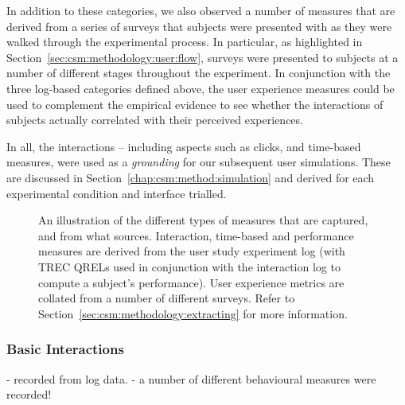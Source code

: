 In addition to these categories, we also observed a number of  measures that are derived from a series of surveys that subjects were presented with as they were walked through the experimental process. In particular, as highlighted in Section~\ref{sec:csm:methodology:user:flow}, surveys were presented to subjects at a number of different stages throughout the experiment. In conjunction with the three log-based categories defined above, the user experience measures could be used to complement the empirical evidence to see whether the interactions of subjects actually correlated with their perceived experiences.

In all, the interactions -- including aspects such as clicks, and time-based measures, were used as a \emph{grounding} for our subsequent user simulations. These are discussed in Section~\ref{chap:csm:method:simulation} and derived for each experimental condition and interface trialled.

\begin{figure}[t!]
    \centering
    \caption[Examples of Evaluation Measures]{An illustration of the different types of measures that are captured, and from what sources. Interaction, time-based and performance measures are derived from the user study experiment log (with TREC QRELs used in conjunction with the interaction log to compute a subject's performance). User experience metrics are collated from a number of different surveys. Refer to Section~\ref{sec:csm:methodology:extracting} for more information.}
    \label{fig:evaluation_methodology}
\end{figure}

\subsubsection{Basic Interactions}
- recorded from log data.
- a number of different behavioural measures were recorded!

